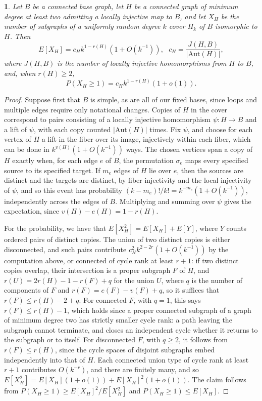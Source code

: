 \documentclass[12pt,oneside,english]{amsart}
\numberwithin{equation}{section}
\numberwithin{figure}{section}
\numberwithin{table}{section}
\theoremstyle{plain}
\numberwithin{thm}{section}
\theoremstyle{plain}
\newtheorem{prop}[thm]{\protect\propositionname}
\theoremstyle{plain}
\theoremstyle{plain}
\theoremstyle{definition}
\theoremstyle{definition}
\theoremstyle{definition}
\theoremstyle{remark}
\providecommand{\propositionname}{Proposition}
\begin{document}
\begin{prop}
\label{prop:defect_counting}Let $B$ be a connected base graph, let
$H$ be a connected graph of minimum degree at least two admitting
a locally injective map to $B$, and let $X_{H}$ be the number of
subgraphs of a uniformly random degree $k$ cover $H_{k}$ of $B$
isomorphic to $H$. Then
\[
E\left[X_{H}\right]=c_{H}k^{1-r(H)}\left(1+O\left(k^{-1}\right)\right),\ \ \ c_{H}=\frac{J(H,B)}{\left|\mathrm{Aut}(H)\right|},
\]
where $J(H,B)$ is the number of locally injective homomorphisms from
$H$ to $B$, and, when $r(H)\geq2$,
\[
P\left(X_{H}\geq1\right)=c_{H}k^{1-r(H)}\left(1+o\left(1\right)\right).
\]
\end{prop}
\begin{proof}
Suppose first that $B$ is simple, as are all of our fixed bases,
since loops and multiple edges require only notational changes. Copies
of $H$ in the cover correspond to pairs consisting of a locally
injective homomorphism $\psi:H\rightarrow B$ and a lift of $\psi$,
with each copy counted $\left|\mathrm{Aut}(H)\right|$ times. Fix
$\psi$, and choose for each vertex of $H$ a lift in the fiber over
its image, injectively within each fiber, which can be done in $k^{v(H)}\left(1+O(k^{-1})\right)$
ways. The chosen vertices span a copy of $H$ exactly when, for each
edge $e$ of $B$, the permutation $\sigma_{e}$ maps every specified
source to its specified target. If $m_{e}$ edges of $H$ lie over
$e$, then the sources are distinct and the targets are distinct,
by fiber injectivity and the local injectivity of $\psi$, and so
this event has probability $\left(k-m_{e}\right)!/k!=k^{-m_{e}}\left(1+O(k^{-1})\right)$,
independently across the edges of $B$. Multiplying and summing over
$\psi$ gives the expectation, since $v(H)-e(H)=1-r(H)$.

For the probability, we have that $E[X_{H}^{2}]=E[X_{H}]+E[Y]$, where
$Y$ counts ordered pairs of distinct copies. The union of two distinct
copies is either disconnected, and such pairs contribute $c_{H}^{2}k^{2-2r}\left(1+O(k^{-1})\right)$
by the computation above, or connected of cycle rank at least $r+1$:
if two distinct copies overlap, their intersection is a proper subgraph
$F$ of $H$, and $r(U)=2r(H)-1-r(F)+q$ for the union $U$, where
$q$ is the number of components of $F$ and $r(F)=e(F)-v(F)+q$,
so it suffices that $r(F)\leq r(H)-2+q$. For connected $F$, with
$q=1$, this says $r(F)\leq r(H)-1$, which holds since a proper connected
subgraph of a graph of minimum degree two has strictly smaller cycle
rank: a path leaving the subgraph cannot terminate, and closes an
independent cycle whether it returns to the subgraph or to itself.
For disconnected $F$, with $q\geq2$, it follows from $r(F)\leq r(H)$,
since the cycle spaces of disjoint subgraphs embed independently into
that of $H$. Each connected union type of cycle rank at least $r+1$
contributes $O(k^{-r})$, and there are finitely many, and so $E[X_{H}^{2}]=E[X_{H}]\left(1+o(1)\right)+E[X_{H}]^{2}\left(1+o(1)\right)$.
The claim follows from $P(X_{H}\geq1)\geq E[X_{H}]^{2}/E[X_{H}^{2}]$
and $P(X_{H}\geq1)\leq E[X_{H}]$.
\end{proof}
\end{document}
